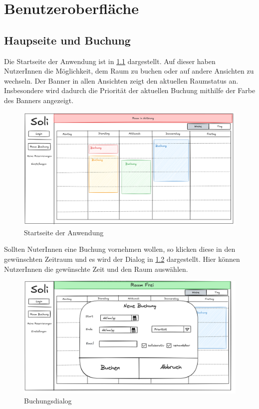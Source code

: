 
\chapter{Benutzeroberfläche}
\label{chap:ui}

\section{Haupseite und Buchung}

Die Startseite der Anwendung ist in \ref{fig:startseite} dargestellt.
Auf dieser haben NutzerInnen die Möglichkeit, dem Raum zu buchen oder auf andere Ansichten zu wechseln.
Der Banner in allen Ansichten zeigt den aktuellen Raumstatus an.
Insbesondere wird dadurch die Priorität der aktuellen Buchung mithilfe der Farbe des Banners angezeigt.
\begin{figure}[ht]
    \centering
    \includegraphics[scale=0.15]{figures/ui/startseite}
    \caption{Startseite der Anwendung}
    \label{fig:startseite}
\end{figure}
\clearpage

Sollten NuterInnen eine Buchung vornehmen wollen, so klicken diese in den gewünschten Zeitraum
und es wird der Dialog in \ref{fig:buchung} dargestellt.
Hier können NutzerInnen die gewünschte Zeit und den Raum auswählen.
\begin{figure}[ht]
    \centering
    \includegraphics[scale=0.15]{figures/ui/buchungsdialog}
    \caption{Buchungsdialog}
    \label{fig:buchung}
\end{figure}
\clearpage

